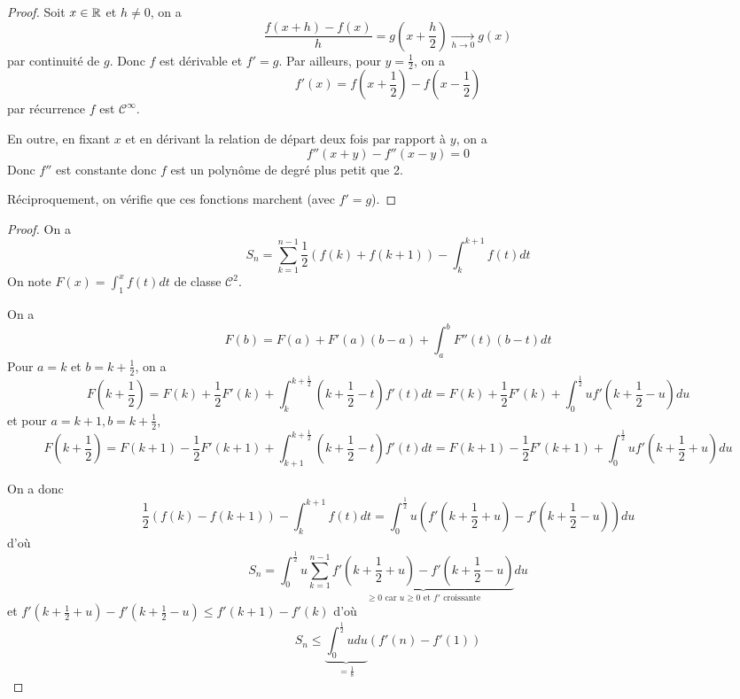 \documentclass[12pt]{article}
\begin{document}
\begin{proof}
	Soit $x\in\mathbb{R}$ et $h\neq0$, on a 
	\begin{equation}\frac{f(x+h)-f(x)}{h}=g(x+\frac{h}{2})\xrightarrow[h\to0]{}g(x)\end{equation}
	par continuité de $g$. Donc $f$ est dérivable et $f'=g$. Par ailleurs, pour $y=\frac{1}{2}$, on a 
	\begin{equation}f'(x)=f(x+\frac{1}{2})-f(x-\frac{1}{2})\end{equation}
	par récurrence $f$ est $\mathcal{C}^{\infty}$.

	En outre, en fixant $x$ et en dérivant la relation de départ deux fois par rapport à $y$, on a 
	\begin{equation}f''(x+y)-f''(x-y)=0\end{equation}
	Donc $f''$ est constante donc $f$ est un polynôme de degré plus petit que 2.

	Réciproquement, on vérifie que ces fonctions marchent (avec $f'=g$).
\end{proof}

\begin{proof}
	On a 
	\begin{equation}S_{n}=\sum_{k=1}^{n-1}\frac{1}{2}(f(k)+f(k+1))-\int_{k}^{k+1}f(t)dt\end{equation}
	On note $F(x)=\int_{1}^{x}f(t)dt$ de classe $\mathcal{C}^{2}$.

	On a
	\begin{equation}F(b)=F(a)+F'(a)(b-a)+\int_{a}^{b}F''(t)(b-t)dt\end{equation}
	Pour $a=k$ et $b=k+\frac{1}{2}$, on a 
	\begin{equation}F(k+\frac{1}{2})=F(k)+\frac{1}{2}F'(k)+\int_{k}^{k+\frac{1}{2}}(k+\frac{1}{2}-t)f'(t)dt=F(k)+\frac{1}{2}F'(k)+\int_{0}^{\frac{1}{2}}uf'(k+\frac{1}{2}-u)du\end{equation}
	et pour $a=k+1,b=k+\frac{1}{2}$,
	\begin{equation}F(k+\frac{1}{2})=F(k+1)-\frac{1}{2}F'(k+1)+\int_{k+1}^{k+\frac{1}{2}}(k+\frac{1}{2}-t)f'(t)dt=F(k+1)-\frac{1}{2}F'(k+1)+\int_{0}^{\frac{1}{2}}uf'(k+\frac{1}{2}+u)du\end{equation}

	On a donc
	\begin{equation}\frac{1}{2}(f(k)-f(k+1))-\int_{k}^{k+1}f(t)dt=\int_{0}^{\frac{1}{2}}u(f'(k+\frac{1}{2}+u)-f'(k+\frac{1}{2}-u))du\end{equation}
	d'où
	\begin{equation}S_{n}=\int_{0}^{\frac{1}{2}}u\sum_{k=1}^{n-1}\underbrace{f'(k+\frac{1}{2}+u)-f'(k+\frac{1}{2}-u)}_{\geqslant0\text{ car }u\geqslant0\text{ et }f'\text{ croissante}}du\end{equation}
	et 
	$f'(k+\frac{1}{2}+u)-f'(k+\frac{1}{2}-u)\leqslant f'(k+1)-f'(k)$ d'où 
	\begin{equation}S_{n}\leqslant\underbrace{\int_{0}^{\frac{1}{2}}udu}_{=\frac{1}{8}}(f'(n)-f'(1))\end{equation}
\end{proof}
\end{document}
